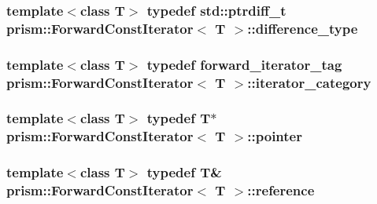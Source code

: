 \subsubsection[{\texorpdfstring{difference\+\_\+type}{difference_type}}]{\setlength{\rightskip}{0pt plus 5cm}template$<$class T$>$ typedef std\+::ptrdiff\+\_\+t {\bf prism\+::\+Forward\+Const\+Iterator}$<$ T $>$\+::{\bf difference\+\_\+type}}\hypertarget{classprism_1_1_forward_const_iterator_ae2a7ad4082065395bff5ac5b724d4b6f}{}\label{classprism_1_1_forward_const_iterator_ae2a7ad4082065395bff5ac5b724d4b6f}
\subsubsection[{\texorpdfstring{iterator\+\_\+category}{iterator_category}}]{\setlength{\rightskip}{0pt plus 5cm}template$<$class T$>$ typedef {\bf forward\+\_\+iterator\+\_\+tag} {\bf prism\+::\+Forward\+Const\+Iterator}$<$ T $>$\+::{\bf iterator\+\_\+category}}\hypertarget{classprism_1_1_forward_const_iterator_afee4cf1bb0fff922f00d6802c6db9974}{}\label{classprism_1_1_forward_const_iterator_afee4cf1bb0fff922f00d6802c6db9974}
\subsubsection[{\texorpdfstring{pointer}{pointer}}]{\setlength{\rightskip}{0pt plus 5cm}template$<$class T$>$ typedef T$\ast$ {\bf prism\+::\+Forward\+Const\+Iterator}$<$ T $>$\+::{\bf pointer}}\hypertarget{classprism_1_1_forward_const_iterator_a6e4e245d3ab99d6e9b237abe2c0c06d8}{}\label{classprism_1_1_forward_const_iterator_a6e4e245d3ab99d6e9b237abe2c0c06d8}
\subsubsection[{\texorpdfstring{reference}{reference}}]{\setlength{\rightskip}{0pt plus 5cm}template$<$class T$>$ typedef T\& {\bf prism\+::\+Forward\+Const\+Iterator}$<$ T $>$\+::{\bf reference}}\hypertarget{classprism_1_1_forward_const_iterator_a839eeb121503b031260ad21ef844dd9a}{}\label{classprism_1_1_forward_const_iterator_a839eeb121503b031260ad21ef844dd9a}
